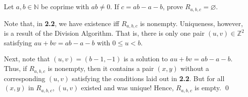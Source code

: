 \documentclass{article}
\newcommand{\N}{\mathbb{N}}
\newcommand{\Z}{\mathbb{Z}}
\begin{document}
\subsection{} %
  Let $a,b\in\N$ be coprime with $ab\ne0$. If $c=ab-a-b$, prove $R_{a,b,c}=
  \varnothing$.

  Note that, in \textbf{2.2}, we have existence iff $R_{a,b,c}$ is nonempty.
  Uniqueness, however, is a result of the Division Algorithm. That is, there is
  only one pair $(u,v)\in\Z^2$ satisfying $au+bv=ab-a-b$ with $0\leq u<b$.

  Next, note that $(u,v)=(b-1,-1)$ is a solution to $au+bv=ab-a-b$. Thus, if
  $R_{a,b,c}$ is nonempty, then it contains a pair $(x,y)$ without a
  corresponding $(u,v)$ satisfying the conditions laid out in \textbf{2.2}. But
  for all $(x,y)$ in $R_{a,b,c}$, $(u,v)$ existed and was unique! Hence,
  $R_{a,b,c}$ is empty.
  \qed
\end{document}
